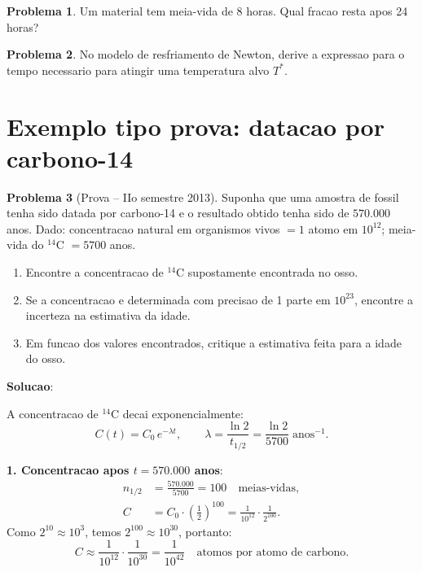 \documentclass[12pt,a4paper,oneside]{book}
\theoremstyle{definition}
\newtheorem{problem}{Problema}
\begin{document}
\begin{problem}
Um material tem meia-vida de 8 horas. Qual fracao resta apos 24 horas?
\end{problem}

\begin{problem}
No modelo de resfriamento de Newton, derive a expressao para o tempo necessario para atingir uma temperatura alvo $T^*$.
\end{problem}

\section{Exemplo tipo prova: datacao por carbono-14}

\begin{problem}[Prova -- IIo semestre 2013]
Suponha que uma amostra de fossil tenha sido datada por carbono-14 e o resultado
obtido tenha sido de $570.000$ anos. Dado: concentracao natural em organismos
vivos $= 1$ atomo em $10^{12}$; meia-vida do ${}^{14}$C $= 5700$ anos.
\begin{enumerate}
    \item Encontre a concentracao de ${}^{14}$C supostamente encontrada no osso.
    \item Se a concentracao e determinada com precisao de 1 parte em $10^{23}$,
    encontre a incerteza na estimativa da idade.
    \item Em funcao dos valores encontrados, critique a estimativa feita para
    a idade do osso.
\end{enumerate}
\end{problem}

\textbf{Solucao}:

A concentracao de ${}^{14}$C decai exponencialmente:
\begin{equation}
C(t) = C_0\,e^{-\lambda t}, \qquad \lambda = \frac{\ln 2}{t_{1/2}} = \frac{\ln 2}{5700}\;\text{anos}^{-1}.
\end{equation}

\textbf{1. Concentracao apos $t = 570.000$ anos}:
\begin{align}
n_{1/2} &= \frac{570.000}{5700} = 100 \quad \text{meias-vidas}, \\
C &= C_0\cdot\left(\tfrac{1}{2}\right)^{100} = \frac{1}{10^{12}}\cdot\frac{1}{2^{100}}.
\end{align}
Como $2^{10} \approx 10^3$, temos $2^{100} \approx 10^{30}$, portanto:
\begin{equation}
C \approx \frac{1}{10^{12}} \cdot \frac{1}{10^{30}} = \frac{1}{10^{42}} \quad \text{atomos por atomo de carbono.}
\end{equation}
\end{document}
